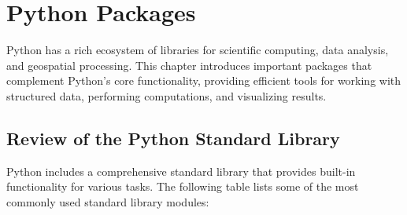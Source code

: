 \chapter{Python Packages}
Python has a rich ecosystem of libraries for scientific computing, data analysis, and geospatial processing. This chapter introduces important packages that complement Python’s core functionality, providing efficient tools for working with structured data, performing computations, and visualizing results.


\section{Review of the Python Standard Library}
Python includes a comprehensive standard library that provides built-in functionality for various tasks. The following table lists some of the most commonly used standard library modules:

